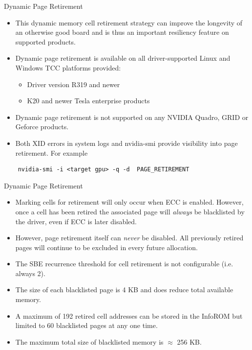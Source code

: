 \documentclass[handout]{beamer}
\begin{document}
\begin{frame}[fragile]{Dynamic Page Retirement}
\begin{itemize}
\itemsep1em
	\item<1->This dynamic memory cell retirement strategy can improve the longevity of an otherwise good board and is thus an important resiliency feature on supported products.
	\item<1->Dynamic page retirement is available on all driver-supported Linux and Windows TCC platforms provided:
	\begin{itemize}
		\item<1->Driver version R319 and newer
		\item<1->K20 and newer Tesla enterprise products
	\end{itemize}
	\item<1->Dynamic page retirement is not supported on any NVIDIA Quadro, GRID or Geforce products.
	\item<1->Both XID errors in system logs and {\selectfont nvidia-smi} provide visibility into page retirement.  For example
\end{itemize}
\begin{lstlisting}
    nvidia-smi -i <target gpu> -q -d  PAGE_RETIREMENT
\end{lstlisting}
\end{frame}

\begin{frame}{Dynamic Page Retirement}
\begin{itemize}
	\item<1->Marking cells for retirement will only occur when ECC is enabled. However, once a cell has been retired the associated page will \emph{always} be blacklisted by the driver, even if ECC is later disabled.
	\item<1->However, page retirement itself can \emph{never} be disabled. All previously retired pages will continue to be excluded in every future allocation. 
	\item<1->The SBE recurrence threshold for cell retirement is not configurable (i.e. always 2).   
	\item<1->The size of each blacklisted page is 4 KB and does reduce total available memory. 
	\item<1->A maximum of 192 retired cell addresses can be stored in the InfoROM but limited to 60 blacklisted pages at any one time. 
	\item<1->The maximum total size of blacklisted memory is $\approx$ 256 KB. 
\end{itemize}
\end{frame}
\end{document}
